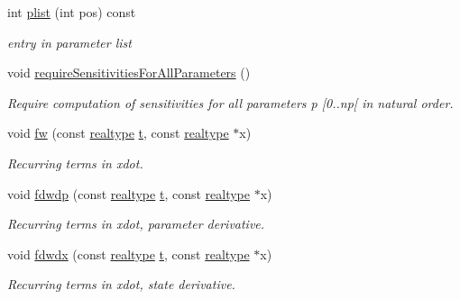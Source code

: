 \begin{DoxyCompactItemize}
int \mbox{\hyperlink{classamici_1_1_model_a6ac0de1b7dfddbb4a480657f62573563}{plist}} (int pos) const
\begin{DoxyCompactList}\small\item\em entry in parameter list \end{DoxyCompactList}\item 
\mbox{\label{classamici_1_1_model_a9b03cc8dbac85d38ced3f59234ba27d9}} 
void \mbox{\hyperlink{classamici_1_1_model_a9b03cc8dbac85d38ced3f59234ba27d9}{require\+Sensitivities\+For\+All\+Parameters}} ()
\begin{DoxyCompactList}\small\item\em Require computation of sensitivities for all parameters p \mbox{[}0..np\mbox{[} in natural order. \end{DoxyCompactList}\item 
void \mbox{\hyperlink{classamici_1_1_model_a7e63009c65fc1361cc5a6e1fc3d5ff1a}{fw}} (const \mbox{\hyperlink{namespaceamici_a1bdce28051d6a53868f7ccbf5f2c14a3}{realtype}} \mbox{\hyperlink{classamici_1_1_model_a711281d57e9710226face29151cc4641}{t}}, const \mbox{\hyperlink{namespaceamici_a1bdce28051d6a53868f7ccbf5f2c14a3}{realtype}} $\ast$x)
\begin{DoxyCompactList}\small\item\em Recurring terms in xdot. \end{DoxyCompactList}\item 
void \mbox{\hyperlink{classamici_1_1_model_a7a8903313cd31dad4fa580c0e434bb1c}{fdwdp}} (const \mbox{\hyperlink{namespaceamici_a1bdce28051d6a53868f7ccbf5f2c14a3}{realtype}} \mbox{\hyperlink{classamici_1_1_model_a711281d57e9710226face29151cc4641}{t}}, const \mbox{\hyperlink{namespaceamici_a1bdce28051d6a53868f7ccbf5f2c14a3}{realtype}} $\ast$x)
\begin{DoxyCompactList}\small\item\em Recurring terms in xdot, parameter derivative. \end{DoxyCompactList}\item 
void \mbox{\hyperlink{classamici_1_1_model_a29b16aa0c3fb0254fb248c003473d5f9}{fdwdx}} (const \mbox{\hyperlink{namespaceamici_a1bdce28051d6a53868f7ccbf5f2c14a3}{realtype}} \mbox{\hyperlink{classamici_1_1_model_a711281d57e9710226face29151cc4641}{t}}, const \mbox{\hyperlink{namespaceamici_a1bdce28051d6a53868f7ccbf5f2c14a3}{realtype}} $\ast$x)
\begin{DoxyCompactList}\small\item\em Recurring terms in xdot, state derivative. \end{DoxyCompactList}\item 

\end{DoxyCompactItemize}
